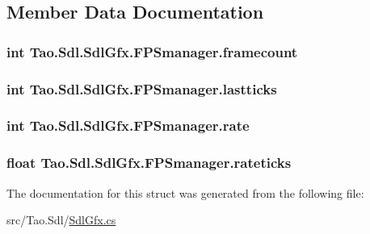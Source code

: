 \subsection{Member Data Documentation}
\hypertarget{struct_tao_1_1_sdl_1_1_sdl_gfx_1_1_f_p_smanager_a2954dc27ca4fe6eb0a532879a3a58643}{
\subsubsection[{framecount}]{\setlength{\rightskip}{0pt plus 5cm}int {\bf Tao.Sdl.SdlGfx.FPSmanager.framecount}}}
\label{struct_tao_1_1_sdl_1_1_sdl_gfx_1_1_f_p_smanager_a2954dc27ca4fe6eb0a532879a3a58643}
\hypertarget{struct_tao_1_1_sdl_1_1_sdl_gfx_1_1_f_p_smanager_a562cc66fe8d9779b97cb21a54656a846}{
\subsubsection[{lastticks}]{\setlength{\rightskip}{0pt plus 5cm}int {\bf Tao.Sdl.SdlGfx.FPSmanager.lastticks}}}
\label{struct_tao_1_1_sdl_1_1_sdl_gfx_1_1_f_p_smanager_a562cc66fe8d9779b97cb21a54656a846}
\hypertarget{struct_tao_1_1_sdl_1_1_sdl_gfx_1_1_f_p_smanager_af9664223888e7aa1ce2f54469c630b13}{
\subsubsection[{rate}]{\setlength{\rightskip}{0pt plus 5cm}int {\bf Tao.Sdl.SdlGfx.FPSmanager.rate}}}
\label{struct_tao_1_1_sdl_1_1_sdl_gfx_1_1_f_p_smanager_af9664223888e7aa1ce2f54469c630b13}
\hypertarget{struct_tao_1_1_sdl_1_1_sdl_gfx_1_1_f_p_smanager_aaa1ed4359758e556829ada4121383b79}{
\subsubsection[{rateticks}]{\setlength{\rightskip}{0pt plus 5cm}float {\bf Tao.Sdl.SdlGfx.FPSmanager.rateticks}}}
\label{struct_tao_1_1_sdl_1_1_sdl_gfx_1_1_f_p_smanager_aaa1ed4359758e556829ada4121383b79}


The documentation for this struct was generated from the following file:\begin{DoxyCompactItemize}
\item 
src/Tao.Sdl/\hyperlink{_sdl_gfx_8cs}{SdlGfx.cs}\end{DoxyCompactItemize}
